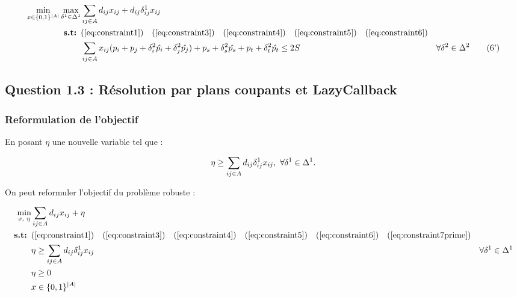 \documentclass{article}
\begin{document}
\begin{align}
  \min_{x \in \{0,1\}^{|A|}} \max_{\delta^{1} \in \Delta^{1}} & \sum_{ij \in A} d_{ij} x_{ij} + d_{ij} \delta_{ij}^{1} x_{ij} && \notag \\
  \textbf{s.t: }  & (\ref{eq:constraint1}) \quad (\ref{eq:constraint3}) \quad (\ref{eq:constraint4}) \quad (\ref{eq:constraint5}) \quad (\ref{eq:constraint6}) \notag \\
  &\sum_{ij \in A} x_{ij}(p_i + p_j + \delta_{i}^{2} \hat{p_i} + \delta_{j}^{2} \hat{p_j}) + p_s + \delta_{s}^{2} \hat{p_s} + p_t + \delta_{t}^{2} \hat{p_t} \leq 2S & \forall \delta^{2} \in \Delta^{2} \tag{6'} \label{eq:constraint7prime}
\end{align}


\subsection{Question 1.3 : Résolution par plans coupants et LazyCallback}

\subsubsection{Reformulation de l'objectif}

En posant $\eta$ une nouvelle variable tel que :

\begin{align}
  \eta \geq \sum_{ij \in A} d_{ij} \delta_{ij}^{1} x_{ij}, \ \forall \delta^{1} \in \Delta^{1}. \notag
\end{align}

On peut reformuler l'objectif du problème robuste : 

\begin{align}
  \min_{x, \hspace{1px} \hspace{1px} \hspace{1px} \eta} & \sum_{ij \in A} d_{ij} x_{ij} + \eta && \notag \\
  \textbf{s.t: }  & (\ref{eq:constraint1}) \quad (\ref{eq:constraint3}) \quad (\ref{eq:constraint4}) \quad (\ref{eq:constraint5}) \quad (\ref{eq:constraint6}) \quad (\ref{eq:constraint7prime}) \notag \\
  & \eta \geq \sum_{ij \in A} d_{ij} \delta_{ij}^{1} x_{ij} & \forall \delta^{1} \in \Delta^{1} \label{eq:constraint12} \\
  & \eta \geq 0 \notag \\
  & x \in \{0,1\}^{|A|} \notag
\end{align}
\end{document}
